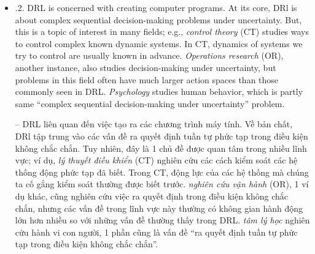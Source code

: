 \documentclass{article}
\begin{document}
\begin{itemize}
\begin{itemize}
\begin{itemize}
            {\bf DL is a powerful toolbox.} Important thing here is DL is a toolbox, \& any advancement in field of DL is felt in all of ML. DRL is intersection of RL \& DL. Bottom line: DRL is an approach to a problem. Field of AI defines problem: creating intelligent machines. 1 of approaches to solving that problem is DRL. Throughout book, will you find comparisons between RL \& other ML approaches, but only in this chap will you find definitions \& a historical overview of AI in general. Important to note: field of RL includes field of DRL, so although I make a distinction when necessary, when refer to RL, remember DRL is included.

            -- {\bf DL là 1 bộ công cụ mạnh mẽ.} Điều quan trọng ở đây là DL là 1 bộ công cụ, \& bất kỳ tiến bộ nào trong lĩnh vực DL đều được cảm nhận trong toàn bộ ML. DRL là giao điểm của RL \& DL. Tóm lại: DRL là 1 cách tiếp cận vấn đề. Lĩnh vực AI định nghĩa vấn đề: tạo ra máy móc thông minh. 1 trong những cách tiếp cận để giải quyết vấn đề đó là DRL. Xuyên suốt cuốn sách, bạn sẽ tìm thấy những so sánh giữa RL \& các cách tiếp cận ML khác, nhưng chỉ trong chương này, bạn mới tìm thấy các định nghĩa \& tổng quan về lịch sử AI nói chung. Lưu ý quan trọng: lĩnh vực RL bao gồm cả lĩnh vực DRL, vì vậy mặc dù tôi có phân biệt khi cần thiết, nhưng khi đề cập đến RL, hãy nhớ rằng DRL cũng được bao gồm.
            \item {.2. DRL is concerned with creating computer programs.} At its core, DRl is about complex sequential decision-making problems under uncertainty. But, this is a topic of interest in many fields; e.g., {\it control theory} (CT) studies ways to control complex known dynamic systems. In CT, dynamics of systems we try to control are usually known in advance. {\it Operations research} (OR), another instance, also studies decision-making under uncertainty, but problems in this field often have much larger action spaces than those commonly seen in DRL. {\it Psychology} studies human behavior, which is partly same ``complex sequential decision-making under uncertainty'' problem.

            -- {\sf DRL liên quan đến việc tạo ra các chương trình máy tính.} Về bản chất, DRl tập trung vào các vấn đề ra quyết định tuần tự phức tạp trong điều kiện không chắc chắn. Tuy nhiên, đây là 1 chủ đề được quan tâm trong nhiều lĩnh vực; ví dụ, {\it lý thuyết điều khiển} (CT) nghiên cứu các cách kiểm soát các hệ thống động phức tạp đã biết. Trong CT, động lực của các hệ thống mà chúng ta cố gắng kiểm soát thường được biết trước. {\it nghiên cứu vận hành} (OR), 1 ví dụ khác, cũng nghiên cứu việc ra quyết định trong điều kiện không chắc chắn, nhưng các vấn đề trong lĩnh vực này thường có không gian hành động lớn hơn nhiều so với những vấn đề thường thấy trong DRL. {\it tâm lý học} nghiên cứu hành vi con người, 1 phần cũng là vấn đề ``ra quyết định tuần tự phức tạp trong điều kiện không chắc chắn''.


\end{itemize}
\end{itemize}
\end{itemize}
\end{document}
